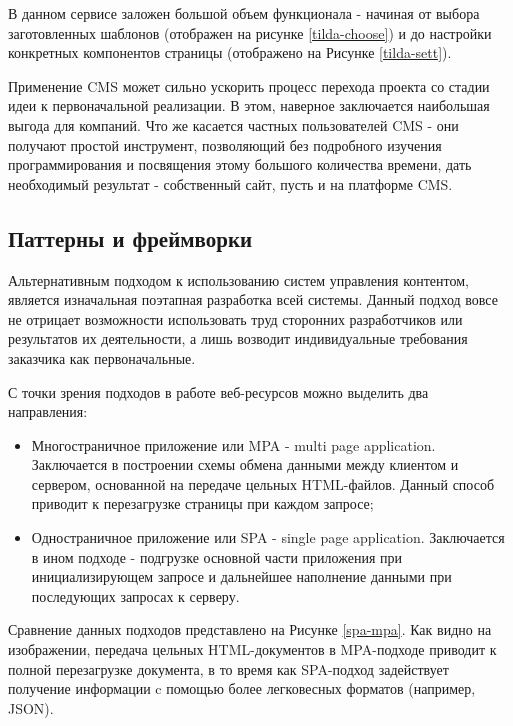 
    В данном сервисе заложен большой объем функционала - начиная от выбора заготовленных шаблонов (отображен на рисунке \ref{tilda-choose}) и до настройки конкретных компонентов страницы (отображено на Рисунке \ref{tilda-sett}).



    Применение CMS может сильно ускорить процесс перехода проекта со стадии идеи к первоначальной реализации.
    В этом, наверное заключается наибольшая выгода для компаний.
    Что же касается частных пользователей CMS - они получают простой инструмент, позволяющий без подробного изучения программирования и посвящения этому большого количества времени, дать необходимый результат - собственный сайт, пусть и на платформе CMS.

\subsection{Паттерны и фреймворки}
    Альтернативным подходом к использованию систем управления контентом, является изначальная поэтапная разработка всей системы.
    Данный подход вовсе не отрицает возможности использовать труд сторонних разработчиков или результатов их деятельности, а лишь возводит индивидуальные требования заказчика как первоначальные.

    С точки зрения подходов в работе веб-ресурсов можно выделить два направления:
    \begin{itemize}
        \item Многостраничное приложение или MPA - multi page application.
        Заключается в построении схемы обмена данными между клиентом и сервером, основанной на передаче цельных HTML-файлов.
        Данный способ приводит к перезагрузке страницы при каждом запросе;
        \item Одностраничное приложение или SPA - single page application.
        Заключается в ином подходе - подгрузке основной части приложения при инициализирующем запросе и дальнейшее наполнение данными при последующих запросах к серверу.
    \end{itemize}

    Сравнение данных подходов представлено на Рисунке \ref{spa-mpa}.
    Как видно на изображении, передача цельных HTML-документов в MPA-подходе приводит к полной перезагрузке документа, в то время как SPA-подход задействует получение информации c помощью более легковесных форматов (например, JSON).

